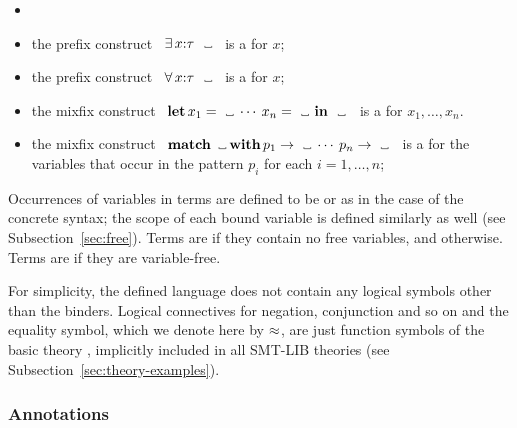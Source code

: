 \begin{itemize}
\item
{}

\item
the prefix construct
\ $\exists\,x{:}\tau\ \vartextvisiblespace$ \ is 
a 
for $x$;

\item
the prefix construct
\ $\forall\,x{:}\tau\ \vartextvisiblespace$ \ is 
a 
for $x$;

\item
the mixfix construct
\ $\akey{let}\,x_1 = \vartextvisiblespace\:\cdots\:x_n = \vartextvisiblespace\ \akey{in}\ \vartextvisiblespace$ \ is 
a 
for $x_1, \ldots, x_n$.

\item
the mixfix construct 
\ $\akey{match}\,\vartextvisiblespace\,\akey{with}\,p_1 \to \vartextvisiblespace\:\cdots\:p_n \to \vartextvisiblespace$ \ is 
a  for the variables that occur in the pattern $p_i$ for each $i=1,\ldots,n$;

\end{itemize}

Occurrences of variables in terms are defined to be  or
 as in the case of the concrete syntax;
the scope of each bound variable is defined similarly as well
(see Subsection~\ref{sec:free}).
Terms are  
if they contain no free variables, and  otherwise.
Terms are  if they are variable-free.

For simplicity,
the defined language does not contain any logical symbols
other than the binders.
Logical connectives for negation, conjunction and so on 
and the equality symbol, which we denote here by $\approx$,
are just function symbols of the basic theory ,
implicitly included in all SMT-LIB theories
(see Subsection~\ref{sec:theory-examples}). 

\subsubsection{Annotations}

